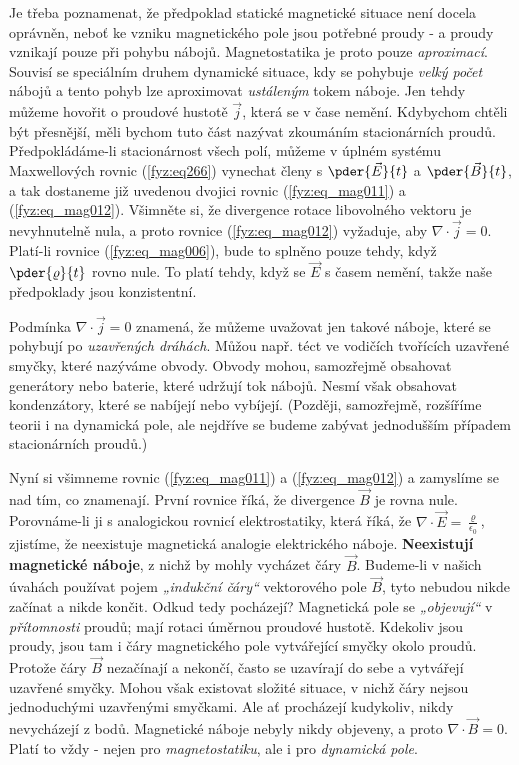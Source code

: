       Je třeba poznamenat, že předpoklad statické magnetické situace není docela oprávněn, neboť 
      ke vzniku magnetického pole jsou potřebné proudy - a proudy vznikají pouze při pohybu nábojů. 
      Magnetostatika je proto pouze \emph{aproximací}. Souvisí se speciálním druhem dynamické 
      situace, kdy se pohybuje \emph{velký počet} nábojů a tento pohyb lze aproximovat 
      \emph{ustáleným} tokem náboje. Jen tehdy můžeme hovořit o proudové hustotě \(\vec{j}\), 
      která se v čase nemění. Kdybychom chtěli být přesnější, měli bychom tuto část nazývat 
      zkoumáním stacionárních proudů. Předpokládáme-li stacionárnost všech polí, můžeme v úplném 
      systému Maxwellových rovnic (\ref{fyz:eq266}) vynechat členy s \(\pder{\vec{E}}{t}\) a 
      \(\pder{\vec{B}}{t}\), a tak dostaneme již uvedenou dvojici rovnic (\ref{fyz:eq_mag011}) a 
      (\ref{fyz:eq_mag012}). Všimněte si, že divergence rotace libovolného vektoru je nevyhnutelně 
      nula, a proto rovnice (\ref{fyz:eq_mag012}) vyžaduje, aby \(\nabla\cdot\vec{j} = 0\). 
      Platí-li rovnice (\ref{fyz:eq_mag006}), bude to splněno pouze tehdy, když 
      \(\pder{\varrho}{t}\) rovno nule. To platí tehdy, když se \(\vec{E}\) s časem  nemění, takže 
      naše předpoklady jsou konzistentní.
      
      Podmínka \(\nabla\cdot\vec{j} = 0\) znamená, že můžeme uvažovat jen takové náboje, které se 
      pohybují po \emph{uzavřených dráhách}. Můžou např. téct ve vodičích tvořících uzavřené 
      smyčky, které nazýváme obvody. Obvody mohou, samozřejmě obsahovat generátory nebo baterie, 
      které udržují tok nábojů. Nesmí však obsahovat kondenzátory, které se nabíjejí nebo 
      vybíjejí. (Později, samozřejmě, rozšíříme teorii i na dynamická pole, ale nejdříve se budeme 
      zabývat jednodušším případem stacionárních proudů.)
      
      Nyní si všimneme rovnic (\ref{fyz:eq_mag011}) a (\ref{fyz:eq_mag012}) a zamyslíme se nad 
      tím, co znamenají. První rovnice říká, že divergence \(\vec{B}\) je rovna nule. Porovnáme-li 
      ji s analogickou rovnicí elektrostatiky, která říká, že \(\nabla\cdot\vec{E} = 
      \frac{\varrho}{\epsilon_0}\), zjistíme, že neexistuje magnetická analogie elektrického 
      náboje. \textbf{Neexistují magnetické náboje}, z nichž by mohly vycházet čáry \(\vec{B}\). 
      Budeme-li v našich úvahách používat pojem \emph{„indukční čáry“} vektorového pole 
      \(\vec{B}\), tyto nebudou nikde začínat a nikde končit. Odkud tedy pocházejí? Magnetická 
      pole se \emph{„objevují“} v \emph{přítomnosti} proudů; mají rotaci úměrnou proudové hustotě. 
      Kdekoliv jsou proudy, jsou tam i čáry magnetického pole vytvářející smyčky okolo proudů. 
      Protože čáry \(\vec{B}\) nezačínají a nekončí, často se uzavírají do sebe a vytvářejí 
      uzavřené smyčky. Mohou však existovat složité situace, v nichž čáry nejsou jednoduchými 
      uzavřenými smyčkami. Ale ať procházejí kudykoliv, nikdy nevycházejí z bodů. Magnetické 
      náboje nebyly nikdy objeveny, a proto \(\nabla\cdot\vec{B} = 0\). Platí to vždy - nejen pro 
      \emph{magnetostatiku}, ale i pro \emph{dynamická pole}.
      
